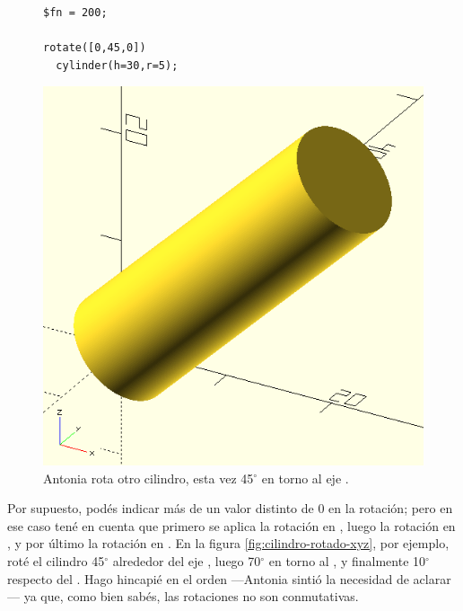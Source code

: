  \begin{figure}[ht]
  \begin{minipage}[]{.5\textwidth}
    \begin{lstlisting}
$fn = 200;

rotate([0,45,0])
  cylinder(h=30,r=5);
    \end{lstlisting}%
  \end{minipage}\hfill
    \begin{minipage}[]{.5\textwidth}
      \centering
      \includegraphics[width=.6\textwidth]{imagenes/cilindro-rotado-y}
    \end{minipage}
    \caption{Antonia rota otro cilindro, esta vez 45$^{\circ}$ en torno al eje
      .}
  \label{fig:cilindro-rotado-y}
\end{figure}


\guillemotright Por supuesto, podés indicar más de un valor distinto
de 0 en la rotación; pero en ese caso tené en cuenta que primero se
aplica la rotación en , luego la rotación en , y por
último la rotación en . En la figura
\ref{fig:cilindro-rotado-xyz}, por ejemplo, roté el cilindro
45$^{\circ}$ alrededor del eje , luego
70$^{\circ}$ en torno al , y finalmente
10$^{\circ}$ respecto del . Hago hincapié en el orden
---Antonia sintió la necesidad de aclarar--- ya que, como bien sabés,
las rotaciones no son conmutativas.

